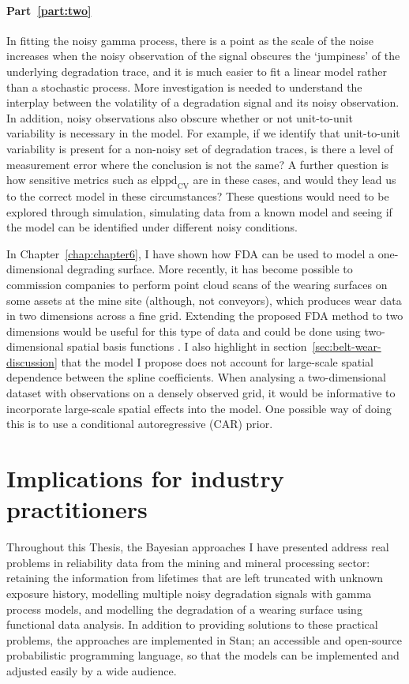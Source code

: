 \paragraph*{Part~\ref{part:two}} In fitting the noisy gamma process, there is a point as the scale of the noise increases when the noisy observation of the signal obscures the `jumpiness' of the underlying degradation trace, and it is much easier to fit a linear model rather than a stochastic process. More investigation is needed to understand the interplay between the volatility of a degradation signal and its noisy observation. In addition, noisy observations also obscure whether or not unit-to-unit variability is necessary in the model. For example, if we identify that unit-to-unit variability is present for a non-noisy set of degradation traces, is there a level of measurement error where the conclusion is not the same? A further question is how sensitive metrics such as $\mbox{elppd}_{\text{CV}}$ are in these cases, and would they lead us to the correct model in these circumstances? These questions would need to be explored through simulation, simulating data from a known model and seeing if the model can be identified under different noisy conditions.

In Chapter~\ref{chap:chapter6}, I have shown how FDA can be used to model a one-dimensional degrading surface. More recently, it has become possible to commission companies to perform point cloud scans of the wearing surfaces on some assets at the mine site (although, not conveyors), which produces wear data in two dimensions across a fine grid. Extending the proposed FDA method to two dimensions would be useful for this type of data and could be done using two-dimensional spatial basis functions \citep[p. 84]{wikle_2019}. I also highlight in section~\ref{sec:belt-wear-discussion} that the model I propose does not account for large-scale spatial dependence between the spline coefficients. When analysing a two-dimensional dataset with observations on a densely observed grid, it would be informative to incorporate large-scale spatial effects into the model. One possible way of doing this is to use a conditional autoregressive (CAR) prior.

\section{Implications for industry practitioners} \label{sec:Thesis-practical}

Throughout this Thesis, the Bayesian approaches I have presented address real problems in reliability data from the mining and mineral processing sector: retaining the information from lifetimes that are left truncated with unknown exposure history, modelling multiple noisy degradation signals with gamma process models, and modelling the degradation of a wearing surface using functional data analysis. In addition to providing solutions to these practical problems, the approaches are implemented in Stan; an accessible and open-source probabilistic programming language, so that the models can be implemented and adjusted easily by a wide audience.

